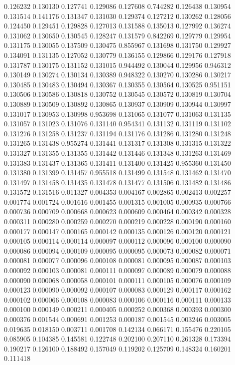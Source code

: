 0.126232
0.130130
0.127741
0.129086
0.127608
0.744282
0.126438
0.130954
0.131514
0.141176
0.131347
0.131030
0.129374
0.127212
0.130262
0.128056
0.124450
0.129451
0.129828
0.127013
0.131588
0.135013
0.127992
0.136274
0.131062
0.130650
0.130545
0.128247
0.131579
0.842269
0.129779
0.129954
0.131175
0.130055
0.137509
0.130475
0.855967
0.131698
0.131750
0.129927
0.134091
0.131135
0.127052
0.130779
0.136155
0.129866
0.129176
0.127918
0.131787
0.130175
0.131152
0.131015
0.944492
0.130044
0.129956
0.946312
0.130149
0.130274
0.130134
0.130389
0.948322
0.130270
0.130286
0.130217
0.130485
0.130483
0.130494
0.130367
0.130355
0.130564
0.130525
0.951151
0.130506
0.130586
0.130818
0.130752
0.130545
0.130572
0.130819
0.130704
0.130889
0.130509
0.130892
0.130865
0.130937
0.130909
0.130944
0.130997
0.131017
0.130953
0.130998
0.953698
0.131065
0.131077
0.131063
0.131135
0.131057
0.131023
0.131076
0.131140
0.954341
0.131132
0.131119
0.131102
0.131276
0.131258
0.131237
0.131194
0.131176
0.131286
0.131280
0.131248
0.131265
0.131438
0.955274
0.131441
0.131317
0.131308
0.131315
0.131322
0.131327
0.131355
0.131355
0.131442
0.131446
0.131348
0.131263
0.131469
0.131383
0.131437
0.131365
0.131411
0.131400
0.131425
0.955360
0.131450
0.131380
0.131399
0.131457
0.955518
0.131499
0.131548
0.131462
0.131470
0.131497
0.131458
0.131435
0.131478
0.131477
0.131506
0.131482
0.131486
0.131572
0.131516
0.011327
0.004353
0.004167
0.002865
0.002413
0.002257
0.001774
0.001724
0.001616
0.001455
0.001315
0.001005
0.000935
0.000766
0.000736
0.000709
0.000668
0.000623
0.000609
0.000464
0.000342
0.000328
0.000311
0.000280
0.000259
0.000270
0.000219
0.000228
0.000190
0.000160
0.000177
0.000147
0.000165
0.000142
0.000135
0.000126
0.000120
0.000121
0.000105
0.000114
0.000114
0.000097
0.000112
0.000096
0.000100
0.000090
0.000086
0.000094
0.000109
0.000095
0.000095
0.000073
0.000082
0.000071
0.000081
0.000077
0.000096
0.000108
0.000081
0.000095
0.000087
0.000103
0.000092
0.000103
0.000081
0.000111
0.000097
0.000089
0.000079
0.000088
0.000090
0.000068
0.000058
0.000101
0.000111
0.000105
0.000076
0.000109
0.000123
0.000090
0.000092
0.000107
0.000083
0.000129
0.000117
0.000162
0.000102
0.000066
0.000108
0.000083
0.000106
0.000116
0.000111
0.000133
0.000100
0.000149
0.000211
0.000405
0.000252
0.000368
0.000393
0.000300
0.000376
0.001544
0.000691
0.001253
0.000187
0.001545
0.003246
0.003005
0.019635
0.018150
0.003711
0.001708
0.142134
0.066171
0.155476
0.220105
0.085905
0.104385
0.145581
0.122748
0.202100
0.207110
0.261328
0.173394
0.190217
0.126100
0.188492
0.157049
0.119202
0.125709
0.148324
0.160201
0.111418
